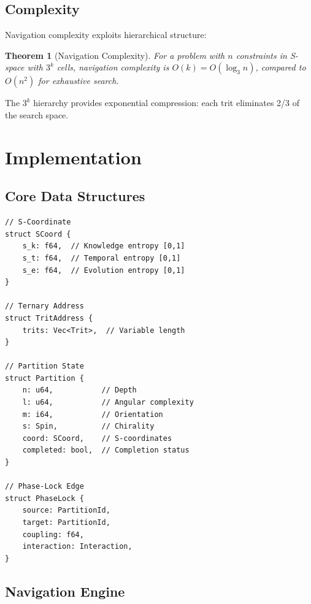 \documentclass[twocolumn,10pt]{article}
\newtheorem{theorem}{Theorem}[section]
\theoremstyle{remark}
\begin{document}
\subsection{Complexity}

Navigation complexity exploits hierarchical structure:

\begin{theorem}[Navigation Complexity]
For a problem with $n$ constraints in S-space with $3^k$ cells, navigation complexity is $O(k) = O(\log_3 n)$, compared to $O(n^2)$ for exhaustive search.
\end{theorem}

The $3^k$ hierarchy provides exponential compression: each trit eliminates 2/3 of the search space.

\section{Implementation}
\label{sec:implementation}

\subsection{Core Data Structures}

\begin{lstlisting}
// S-Coordinate
struct SCoord {
    s_k: f64,  // Knowledge entropy [0,1]
    s_t: f64,  // Temporal entropy [0,1]
    s_e: f64,  // Evolution entropy [0,1]
}

// Ternary Address
struct TritAddress {
    trits: Vec<Trit>,  // Variable length
}

// Partition State
struct Partition {
    n: u64,           // Depth
    l: u64,           // Angular complexity
    m: i64,           // Orientation
    s: Spin,          // Chirality
    coord: SCoord,    // S-coordinates
    completed: bool,  // Completion status
}

// Phase-Lock Edge
struct PhaseLock {
    source: PartitionId,
    target: PartitionId,
    coupling: f64,
    interaction: Interaction,
}
\end{lstlisting}

\subsection{Navigation Engine}
\end{document}
